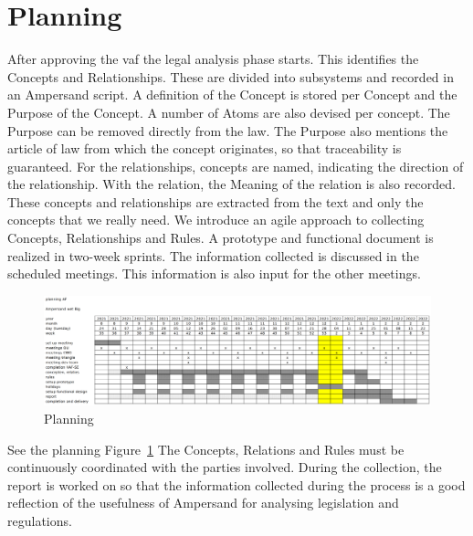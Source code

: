 \section{Planning} \label{planning}

After approving the \acrfull{vaf} the legal analysis phase starts.
This identifies the Concepts and Relationships.
These are divided into subsystems and recorded in an Ampersand script.
A definition of the Concept is stored per Concept and the Purpose of the Concept.
A number of Atoms are also devised per concept.
The Purpose can be removed directly from the law.
The Purpose also mentions the article of law from which the concept originates, so that traceability is guaranteed.
For the relationships, concepts are named, indicating the direction of the relationship.
With the relation, the Meaning of the relation is also recorded.
These concepts and relationships are extracted from the text and only the concepts that we really need.
We introduce an agile approach to collecting Concepts, Relationships and Rules. A prototype and functional document is realized in two-week sprints. The information collected is discussed in the scheduled meetings. This information is also input for the other meetings.

\begin{figure}[htp]
    \centering
    \includegraphics[width=1\textwidth]{00_common/04_images/planning.png}
    \caption{Planning}
    \label{fig:Planning}
\end{figure}
See the planning Figure~\ref{fig:Planning}
The Concepts, Relations and Rules must be continuously coordinated with the parties involved.
During the collection, the report is worked on so that the information collected during the process is a good reflection of the usefulness of Ampersand for analysing legislation and regulations.

